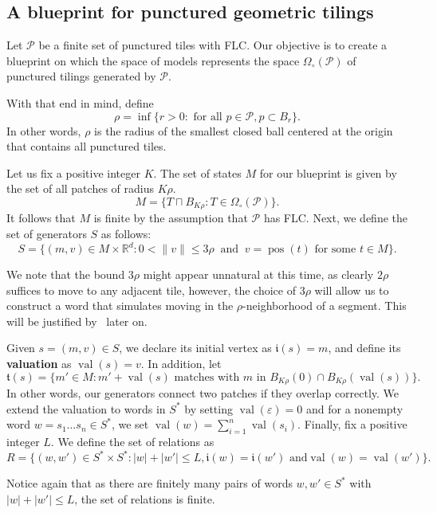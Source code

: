 \documentclass{article}
\theoremstyle{definition}
\theoremstyle{definition}
\newcommand{\R}{\mathbb{R}}
\newcommand{\PP}{\mathcal{P}}
\newcommand{\init}{\mathfrak{i}}
\newcommand{\ter}{\mathfrak{t}}
\newcommand{\val}{\operatorname{val}}
\newcommand{\pos}{\operatorname{pos}}
\newcommand{\define}[1]{\textbf{#1}}
\begin{document}
\subsection{A blueprint for punctured geometric tilings}\label{subsec:blueprint_geometric}

Let $\PP$ be a finite set of punctured tiles with FLC. Our objective is to create a blueprint on which the space of models represents the space $\Omega_{\circ}(\PP)$ of punctured tilings generated by $\PP$.

With that end in mind, define \[ \rho = \inf\{ r >0 : \mbox{ for all } p \in \PP, p \subset B_r\}. \]
In other words, $\rho$ is the radius of the smallest closed ball centered at the origin that contains all punctured tiles. 

Let us fix a positive integer $K$. The set of states $M$ for our blueprint is given by the set of all patches of radius $K\rho$.
$$M = \{T\sqcap B_{K\rho} : T\in \Omega_\circ(\PP)\}.$$
It follows that $M$ is finite by the assumption that $\PP$ has FLC. Next, we define the set of generators $S$ as follows: \[ S = \{ (m,v) \in M \times \R^d: 0 < \|{v}\| \leq 3\rho \ \mbox{ and } \ v = \pos(t) \mbox{ for some } t \in M\}. \]

We note that the bound $3\rho$ might appear unnatural at this time, as clearly $2\rho$ suffices to move to any adjacent tile, however, the choice of $3\rho$ will allow us to construct a word that simulates moving in the $\rho$-neighborhood of a segment. This will be justified by~ later on.

Given $s = (m,v) \in S$, we declare its initial vertex as $\init(s) = m$, and define its \define{valuation} as $\val(s)= v$. In addition, let \[ \ter(s) = \{m' \in M \colon  m'+\val(s) \mbox{ matches with } m \mbox{ in } B_{K\rho}(0) \cap B_{K\rho}(\val(s))\}.    \]
In other words, our generators connect two patches if they overlap correctly. We extend the valuation to words in $S^*$ by setting $\val(\varepsilon) = 0$ and for a nonempty word $w = s_1\dots s_n \in S^*$, we set $\val(w) = \sum_{i=1}^n \val(s_i)$.
Finally, fix a positive integer $L$. We define the set of relations as \[ R = \{ (w,w') \in S^*\times S^* \colon |w|+|w'| \leq L, \init(w) = \init(w') \mbox{ and}  \val(w)=\val(w') \}.    \]

Notice again that as there are finitely many pairs of words $w,w' \in S^*$ with $|w|+|w'|\leq L$, the set of relations is finite.
\end{document}
